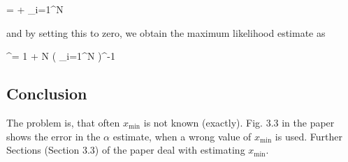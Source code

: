 \bee
{} =  + \sum_{i=1}^N \ln {}
\eee

and by setting this to zero, we obtain the maximum likelihood estimate as

\bee
\alpha^\star = 1 + N \left( \sum_{i=1}^N \ln {} \right)^{-1}
\eee

\subsection{Conclusion}

The problem is, that often $x_{\text{min}}$ is not known (exactly). Fig. 3.3 in the paper shows the error in the $\alpha$ estimate, when a wrong value of $x_{\text{min}}$ is used. Further Sections (Section 3.3) of the paper deal with estimating $x_{\text{min}}$.